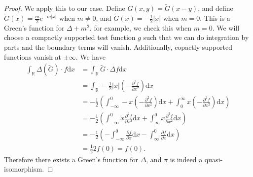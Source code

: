 \begin{proof}
We apply this to our case. Define $G(x,y)=\widetilde{G} (x-y)$, and define $\widetilde{G} (x)=\frac{m}{2} e^{-m \left| x \right| } $ when $m\neq 0$, and $\widetilde{G} (x)=-\frac{1}{2} \left| x \right| $ when $m=0$. This is a Green's function for $\Delta+m^2$. for example, we check this when $m=0$. We will choose a compactly supported test function $g$ such that we can do integration by parts and the boundary terms will vanish. Additionally, copactly supported functions vanish at $\pm \infty $. We have
\begin{align*}
	\int_{\mathbb{R} } \Delta (\widetilde{G} )\cdot f \mathrm{d} x &=\int_{\mathbb{R} } \widetilde{G} \cdot \Delta f\mathrm{d} x\\
								       &=\int_{\mathbb{R} } -\frac{1}{2} \left| x \right| \left( -\frac{\partial ^2f}{\partial x^2}  \right) \mathrm{d} x\\
								       &=-\frac{1}{2} \left( \int_{-\infty }^{0} -x\left(- \frac{\partial ^2f}{\partial x^2}\right)   \mathrm{d} x + \int_{0}^{\infty } x \left( -\frac{\partial ^2f}{\partial x^2}  \right) \mathrm{d} x \right) \\
								       &=-\frac{1}{2} \left( \int_{-\infty }^{0} x \frac{\partial ^2f}{\partial x^2} \mathrm{d} x + \int_{\infty }^{0} x \frac{\partial ^2f}{\partial x^2} \mathrm{d} x \right) \\
								       &=-\frac{1}{2} \left( -\int_{-\infty }^{0} \frac{\partial f}{\partial x}  \mathrm{d} x - \int_{\infty }^{0} \frac{\partial f}{\partial x} \mathrm{d} x \right) \\
								       &=\frac{1}{2} 2f(0)=f(0)
.\end{align*}
Therefore there exists a Green's function for $\Delta $, and $\pi $ is indeed a quasi-isomorphism.
\end{proof}
